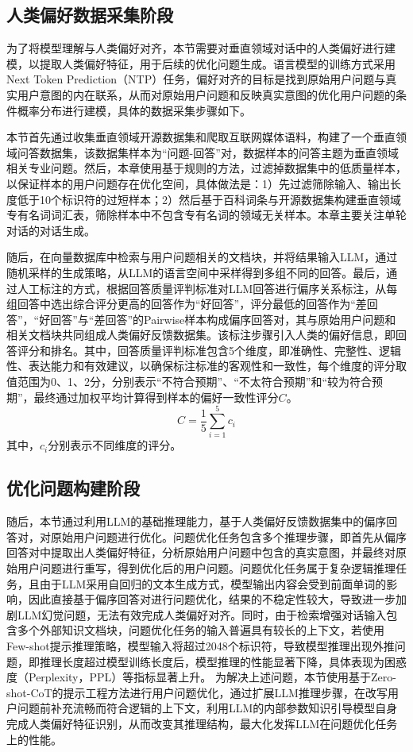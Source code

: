 \subsection{人类偏好数据采集阶段}

为了将模型理解与人类偏好对齐，本节需要对垂直领域对话中的人类偏好进行建模，以提取人类偏好特征，用于后续的优化问题生成。语言模型的训练方式采用Next Token Prediction（NTP）任务，偏好对齐的目标是找到原始用户问题与真实用户意图的内在联系，从而对原始用户问题和反映真实意图的优化用户问题的条件概率分布进行建模，具体的数据采集步骤如下。

本节首先通过收集垂直领域开源数据集和爬取互联网媒体语料，构建了一个垂直领域问答数据集，该数据集样本为“问题-回答”对，数据样本的问答主题为垂直领域相关专业问题。然后，本章使用基于规则的方法，过滤掉数据集中的低质量样本，以保证样本的用户问题存在优化空间，具体做法是：1）先过滤筛除输入、输出长度低于10个标识符的过短样本；2）然后基于百科词条与开源数据集构建垂直领域专有名词词汇表，筛除样本中不包含专有名词的领域无关样本。本章主要关注单轮对话的对话生成。

随后，在向量数据库中检索与用户问题相关的文档块，并将结果输入LLM，通过随机采样的生成策略，从LLM的语言空间中采样得到多组不同的回答。最后，通过人工标注的方式，根据回答质量评判标准对LLM回答进行偏序关系标注，从每组回答中选出综合评分更高的回答作为“好回答”，评分最低的回答作为“差回答”，“好回答”与“差回答”的Pairwise样本构成偏序回答对，其与原始用户问题和相关文档块共同组成人类偏好反馈数据集。该标注步骤引入人类的偏好信息，即回答评分和排名。其中，回答质量评判标准包含5个维度，即准确性、完整性、逻辑性、表达能力和有效建议，以确保标注标准的客观性和一致性，每个维度的评分取值范围为0、1、2分，分别表示“不符合预期”、“不太符合预期”和“较为符合预期”，最终通过加权平均计算得到样本的偏好一致性评分$C$。
\begin{equation}
	C = \frac{1}{5}\sum_{i=1}^{5}c_i
\end{equation}
其中，$c_i$分别表示不同维度的评分。

\subsection{优化问题构建阶段}

随后，本节通过利用LLM的基础推理能力，基于人类偏好反馈数据集中的偏序回答对，对原始用户问题进行优化。问题优化任务包含多个推理步骤，即首先从偏序回答对中提取出人类偏好特征，分析原始用户问题中包含的真实意图，并最终对原始用户问题进行重写，得到优化后的用户问题。问题优化任务属于复杂逻辑推理任务，且由于LLM采用自回归的文本生成方式，模型输出内容会受到前面单词的影响，因此直接基于偏序回答对进行问题优化，结果的不稳定性较大，导致进一步加剧LLM幻觉问题，无法有效完成人类偏好对齐。同时，由于检索增强对话输入包含多个外部知识文档块，问题优化任务的输入普遍具有较长的上下文，若使用Few-shot提示推理策略，模型输入将超过2048个标识符，导致模型推理出现外推问题，即推理长度超过模型训练长度后，模型推理的性能显著下降，具体表现为困惑度（Perplexity，PPL）等指标显著上升。
为解决上述问题，本节使用基于Zero-shot-CoT的提示工程方法进行用户问题优化，通过扩展LLM推理步骤，在改写用户问题前补充流畅而符合逻辑的上下文，利用LLM的内部参数知识引导模型自身完成人类偏好特征识别，从而改变其推理结构，最大化发挥LLM在问题优化任务上的性能。

